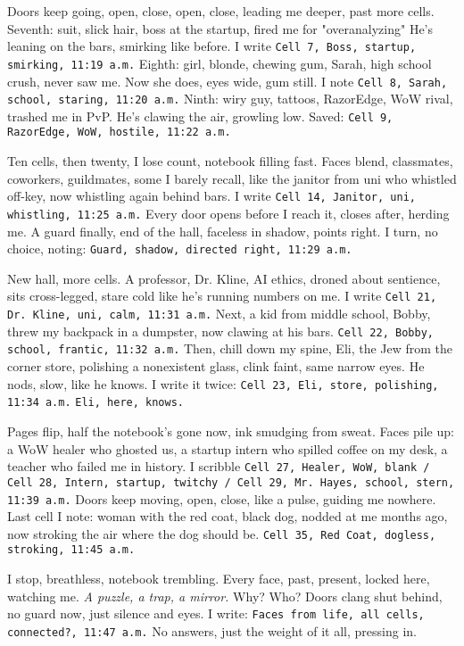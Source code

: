 \documentclass[12pt,oneside]{book}
\newcommand{\note}[1]{\texttt{#1}}
\begin{document}
Doors keep going, open, close, open, close, leading me deeper, past more cells. Seventh: suit, slick hair, boss at the startup, fired me for "overanalyzing" He’s leaning on the bars, smirking like before. I write \note{Cell 7, Boss, startup, smirking, 11:19 a.m.} Eighth: girl, blonde, chewing gum, Sarah, high school crush, never saw me. Now she does, eyes wide, gum still. I note \note{Cell 8, Sarah, school, staring, 11:20 a.m.} Ninth: wiry guy, tattoos, RazorEdge, WoW rival, trashed me in PvP. He’s clawing the air, growling low. Saved: \note{Cell 9, RazorEdge, WoW, hostile, 11:22 a.m.}

Ten cells, then twenty, I lose count, notebook filling fast. Faces blend, classmates, coworkers, guildmates, some I barely recall, like the janitor from uni who whistled off-key, now whistling again behind bars. I write \note{Cell 14, Janitor, uni, whistling, 11:25 a.m.} Every door opens before I reach it, closes after, herding me. A guard finally, end of the hall, faceless in shadow, points right. I turn, no choice, noting: \note{Guard, shadow, directed right, 11:29 a.m.}

New hall, more cells. A professor, Dr. Kline, AI ethics, droned about sentience, sits cross-legged, stare cold like he’s running numbers on me. I write \note{Cell 21, Dr. Kline, uni, calm, 11:31 a.m.} Next, a kid from middle school, Bobby, threw my backpack in a dumpster, now clawing at his bars. \note{Cell 22, Bobby, school, frantic, 11:32 a.m.} Then, chill down my spine, Eli, the Jew from the corner store, polishing a nonexistent glass, clink faint, same narrow eyes. He nods, slow, like he knows. I write it twice: \note{Cell 23, Eli, store, polishing, 11:34 a.m.} \note{Eli, here, knows.}

Pages flip, half the notebook’s gone now, ink smudging from sweat. Faces pile up: a WoW healer who ghosted us, a startup intern who spilled coffee on my desk, a teacher who failed me in history. I scribble \note{Cell 27, Healer, WoW, blank / Cell 28, Intern, startup, twitchy / Cell 29, Mr. Hayes, school, stern, 11:39 a.m.} Doors keep moving, open, close, like a pulse, guiding me nowhere. Last cell I note: woman with the red coat, black dog, nodded at me months ago, now stroking the air where the dog should be. \note{Cell 35, Red Coat, dogless, stroking, 11:45 a.m.}

I stop, breathless, notebook trembling. Every face, past, present, locked here, watching me. \textit{A puzzle, a trap, a mirror.} Why? Who? Doors clang shut behind, no guard now, just silence and eyes. I write: \note{Faces from life, all cells, connected?, 11:47 a.m.} No answers, just the weight of it all, pressing in.
\end{document}
